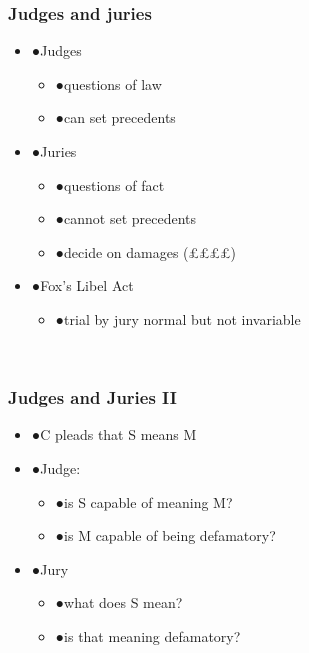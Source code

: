 \documentclass[ignorenonframetext,]{beamer}
\begin{document}
\begin{frame}
\frametitle{Judges and juries}

\begin{itemize}
\item  {●}Judges

  \begin{itemize}
  \item    {●}questions of law
  \item    {●}can set precedents
  \end{itemize}
\item  {●}Juries

  \begin{itemize}
  \item    {●}questions of fact
  \item    {●}cannot set precedents
  \item    {●}decide on damages (££££)
  \end{itemize}
\item  {●}Fox's Libel Act

  \begin{itemize}
  \item    {●}trial by jury normal but not invariable
  \end{itemize}
\end{itemize}

~


\end{frame}

\begin{frame}
\frametitle{Judges and Juries II}

\begin{itemize}
\item  {●}C pleads that S means M
\item  {●}Judge:

  \begin{itemize}
  \item    {●}is S capable of meaning M?
  \item    {●}is M capable of being defamatory?
  \end{itemize}
\item  {●}Jury

  \begin{itemize}
  \item    {●}what does S mean?
  \item    {●}is that meaning defamatory?
  \end{itemize}
\end{itemize}

~


\end{frame}
\end{document}
